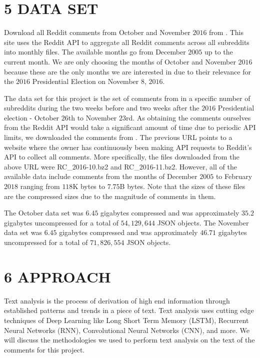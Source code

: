 \documentclass[letterpaper]{article}
\begin{document}

\section{5 DATA SET}

Download all Reddit comments from October and November $2016$ from . This site uses the Reddit API to aggregate all Reddit comments across all subreddits into monthly files. The available months go from December $2005$ up to the current month. We are only choosing the months of October and November $2016$ because these are the only months we are interested in due to their relevance for the $2016$ Presidential Election on November $8$, $2016$.

The data set for this project is the set of comments from  in a specific number of subreddits during the two weeks before and two weeks after the $2016$ Presidential election - October $26$th to November $23$rd. As obtaining the comments ourselves from the Reddit API would take a significant amount of time due to periodic API limits, we downloaded the comments from . The previous URL points to a website where the owner has continuously been making API requests to Reddit's API to collect all comments. More specifically, the files downloaded from the above URL were  RC\_2016-10.bz2 and RC\_2016-11.bz2. However, all of the available data include comments from the months of December $2005$ to February $2018$ ranging from $118$K bytes to $7.75$B bytes. Note that the sizes of these files are the compressed sizes due to the magnitude of comments in them.

The October data set was $6.45$ gigabytes compressed and was approximately $35.2$ gigabytes uncompressed for a total of $54,129,644$ JSON objects. The November data set was $6.45$ gigabytes compressed and was approximately $46.71$ gigabytes uncompressed for a total of $71,826,554$ JSON objects.


\section{6 APPROACH}

Text analysis is the process of derivation of high end information through established patterns and trends in a piece of text. Text analysis uses cutting edge techniques of Deep Learning like Long Short Term Memory (LSTM), Recurrent Neural Networks (RNN), Convolutional Neural Networks (CNN), and more. We will discuss the methodologies we used to perform text analysis on the text of the comments for this project.
\end{document}

